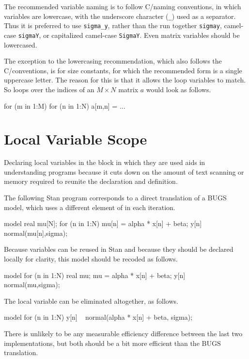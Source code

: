 The recommended variable naming is to follow C/\Cpp naming
conventions, in which variables are lowercase, with the underscore
character (\Verb|_|) used as a separator.  Thus it is preferred to use
\Verb|sigma_y|, rather than the run together \Verb|sigmay|, camel-case
\Verb|sigmaY|, or capitalized camel-case \Verb|SigmaY|.  Even matrix
variables should be lowercased.

The exception to the lowercasing recommendation, which also follows
the C/\Cpp conventions, is for size constants, for which the
recommended form is a single uppercase letter.  The reason for this is
that it allows the loop variables to match.  So loops over the indices of
an $M \times N$ matrix $a$ would look as follows.
%
\begin{stancode}
for (m in 1:M)
  for (n in 1:N)
     a[m,n] = ...
\end{stancode}


\section{Local Variable Scope}

Declaring local variables in the block in which they are used aids in
understanding programs because it cuts down on the amount of text
scanning or memory required to reunite the declaration and definition.

The following Stan program corresponds to a direct translation of a
BUGS model, which uses a different element of  in each
iteration.
%
\begin{stancode}
model {
  real mu[N];
  for (n in 1:N) {
    mu[n] = alpha * x[n] + beta;
    y[n] ~ normal(mu[n],sigma);
  }
}
\end{stancode}
%
Because variables can be reused in Stan and because they should be
declared locally for clarity, this model should be recoded as follows.
%
\begin{stancode}
model {
  for (n in 1:N) {
    real mu;
    mu = alpha * x[n] + beta;
    y[n] ~ normal(mu,sigma);
  }
}
\end{stancode}
% 
The local variable can be eliminated altogether, as follows.
%
\begin{stancode}
model {
  for (n in 1:N)
    y[n] ~ normal(alpha * x[n] + beta, sigma);
}
\end{stancode}
%
There is unlikely to be any measurable efficiency difference
between the last two implementations, but both should be a bit
more efficient than the BUGS translation.

